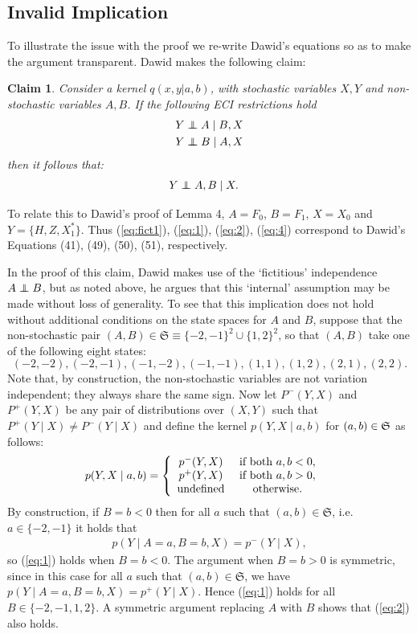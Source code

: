 \documentclass[11pt]{article}
\newtheorem{claim}[theorem]{Claim}
\newcommand\indep{\protect\mathpalette{\protect\independenT}{\perp}}
\def\independenT#1#2{\mathrel{\rlap{$#1#2$}\mkern2.5mu{#1#2}}}
\begin{document}
{\subsection{Invalid Implication}

To illustrate the issue with the proof we re-write Dawid's equations so as to make the argument transparent. 
Dawid makes the following claim:
\begin{claim}\label{claim:dawid}
Consider a kernel $q(x,y | a,b)$, with stochastic variables $X,Y$ and non-stochastic variables $A, B$. If the following ECI restrictions hold
\begin{align}
Y &\indep A \mid B,X\label{eq:1}\\
Y &\indep B \mid A,X\label{eq:2}
\end{align}
then it follows that:
\begin{align}
Y & \indep A,B \mid X.\label{eq:4}
\end{align}
\end{claim}

To relate this to Dawid's proof of Lemma 4, $A=F_0$, $B=F_1$, $X=X_0$ and $Y=\{H,Z,X_1^*\}$. Thus (\ref{eq:fict1}), (\ref{eq:1}), (\ref{eq:2}), (\ref{eq:4})
correspond to Dawid's Equations (41), (49), (50), (51), respectively.

In the proof of this claim, Dawid makes use of the `fictitious' independence $A \indep B$, but as noted above, he argues that this `internal' assumption may be made without loss of generality. To see that this implication does not hold without additional conditions on the state spaces for $A$ and $B$, suppose that the non-stochastic pair $(A,B) \in \mathfrak{S} \equiv \{-2,-1\}^2 \cup \{1,2\}^2$, so that $(A,B)$ take one of the following eight states:
\[
(-2,-2), (-2,-1), (-1,-2), (-1,-1), (1,1), (1,2), (2,1), (2,2).
\]
Note that, by construction, the non-stochastic variables are not variation independent; they always share the same sign.
Now let $P^{-}(Y,X)$ and $P^{+}(Y,X)$ be any pair of distributions over $(X,Y)$ such that $P^+(Y\mid X) \neq P^-(Y\mid X)$ and define the kernel
$p(Y, X \mid a,b)$ for $(a,b) \in \frak{S}$ as follows:
\begin{align}
p(Y, X \mid a,b) &= \left\{\begin{array}{cc}
p^{-}(Y,X) & \hbox{ if both } a,b < 0,\\
p^{+}(Y,X) & \hbox{ if both } a,b > 0,\\
\hbox{undefined} & \hbox{ otherwise}.
\end{array}
\right.
\end{align}
By construction, if $B=b<0$ then for all $a$ such that $(a,b) \in \mathfrak{S}$, i.e.~$a\in \{-2,-1\}$ it holds that
\begin{align}
p(Y \mid A=a, B=b, X) = p^-(Y\mid X),
\end{align}
so (\ref{eq:1}) holds when $B=b<0$. The argument when $B=b >0$ is symmetric, since in this case for all $a$ such that 
 $(a,b) \in \mathfrak{S}$, we have 
$p(Y \mid A=a,B=b, X) = p^+(Y\mid X)$.
Hence (\ref{eq:1}) holds for all $B \in \{-2,-1,1,2\}$. A symmetric argument replacing $A$ with $B$ shows that (\ref{eq:2}) also holds.

}
\end{document}
